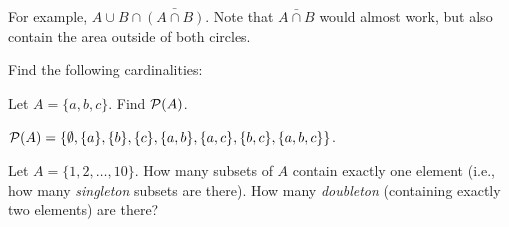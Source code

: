 \begin{questions}
  \begin{answer}
    For example, $A \cup B \cap \bar{(A \cap B)}$.  Note that $\bar{A \cap B}$ would almost work, but also contain the area outside of both circles.
  \end{answer}



\question Find the following cardinalities:

  \begin{answer}
  \end{answer}



\question Let $A = \{a, b, c\}$.  Find $\mathcal P(A)$.

  \begin{answer}
    $\mathcal P(A) = \{\emptyset, \{a\}, \{b\}, \{c\}, \{a,b\}, \{a,c\}, \{b,c\}, \{a,b,c\}\}$.
  \end{answer}




\question Let $A = \{1,2,\ldots, 10\}$.  How many subsets of $A$ contain exactly one element (i.e., how many {\em singleton} subsets are there).  How many {\em doubleton} (containing exactly two elements) are there?


\end{questions}
